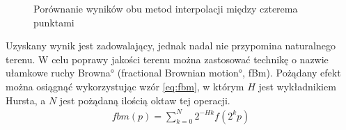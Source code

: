 \begin{figure}[H]
\centering
{}
\caption{Porównanie wyników obu metod interpolacji między czterema punktami}
\label{fig:interpolacja}
\end{figure}

Uzyskany wynik jest zadowalający, jednak nadal nie przypomina naturalnego terenu. W celu poprawy jakości terenu można zastosować technikę o nazwie \ang{ułamkowe ruchy Browna} (\ang{fractional Brownian motion}, fBm)\cite{bib:bookofshaders}\cite{bib:Musgrave2003ProceduralFT}. Pożądany efekt można osiągnąć wykorzystując wzór \ref{eq:fbm}\cite{bib:iqfbm}, w którym $H$ jest wykładnikiem Hursta, a $N$ jest pożądaną ilością oktaw tej operacji.
\begin{equation}
\label{eq:fbm}
  \begin{split}
    fbm(p) = \sum^N_{k = 0} 2^{-Hk}f(2^kp)
  \end{split}
\end{equation}

